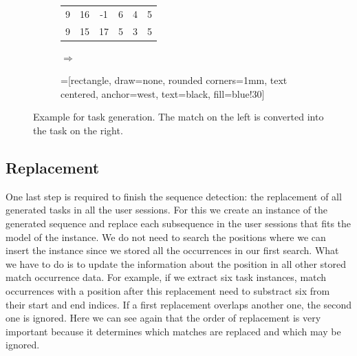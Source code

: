 \begin{figure}[h]
	\centering
	\begin{subfigure}[c]{0.44\textwidth}
		\centering
	\begin{tabular}{cccccc}
		9 & 16 & -1 & 6 & 4& 5\\
		9 & 15 & 17 & 5 & 3& 5\\
	\end{tabular}
	\end{subfigure}
	\begin{subfigure}[c]{0.1\textwidth}
		\centering

		\Large{$\Rightarrow$}
	\end{subfigure}
	\begin{subfigure}[c]{0.44\textwidth}
		=[rectangle, draw=none, rounded corners=1mm,
		        text centered, anchor=west, text=black, fill=blue!30]

	\end{subfigure}
	\caption{Example for task generation. The match on the left is converted into the task on the right.}
	\label{fig:matchexampletaskgeneration}
\end{figure}

\subsection{Replacement}
One last step is required to finish the sequence detection: the replacement of all generated tasks in all the user sessions.
For this we create an instance of the generated sequence and replace each subsequence in the user sessions that fits the model of the instance.
We do not need to search the positions where we can insert the instance since we stored all the occurrences in our first search.
What we have to do is to update the information about the position in all other stored match occurrence data.
For example, if we extract six task instances, match occurrences with a position after this replacement need to substract six from their start and end indices.
If a first replacement overlaps another one, the second one is ignored. Here we can see again that the order of replacement is very important  because it determines which
matches are replaced and which may be ignored.

